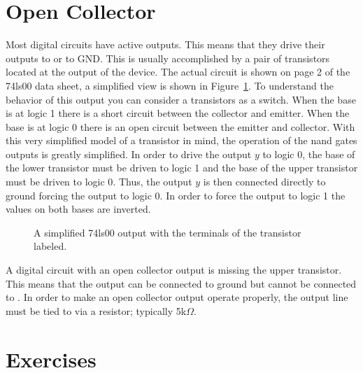 \section{Open Collector}
Most digital circuits have active outputs.  This means that they drive 
their outputs to \VCC or to GND.  This is usually accomplished 
by a pair of transistors located at the output of the device.  The 
actual circuit is shown on page 2 of the 74ls00 data sheet,
a simplified view is shown in Figure~\ref{fig:transistor}.  To 
understand the behavior of this output you can consider 
a transistors as a switch.  When the base is at logic 1 there is
a short circuit between the collector and emitter.  When the base is 
at logic 0 there is an open circuit between the emitter and
collector.  With this very simplified model of a transistor in mind,
the operation of the nand gates outputs is greatly simplified.  In
order to drive the output $y$ to logic 0, the base of the lower 
transistor must be driven to logic 1 and the base of the upper
transistor must be driven to logic 0.  Thus, the output $y$ is then
connected directly to ground forcing the output to logic 0.  In order
to force the output to logic 1 the values on both bases are inverted.

\begin{figure}[ht]
\caption{A simplified 74ls00 output with the terminals of the 
transistor labeled.}
\label{fig:transistor}
\end{figure}

A digital circuit with an open collector output is missing the upper
transistor.  This means that the output can be connected to ground
but cannot be connected to \VCC.  In order to make an open collector
output operate properly, the output line must be tied to \VCC via
a resistor; typically 5k$\Omega$.

\section{Exercises}

